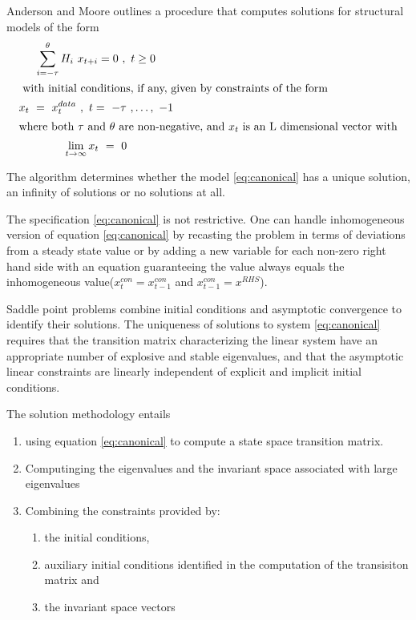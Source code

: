 Anderson and Moore \cite{ANDER:AIM2} outlines a procedure that computes solutions for structural models of the form
\begin{gather}
\sum_{i= - \tau}^\theta { H_i ~ x_{ t + i } }= 0~,~ t \geq 0 \label{eq:canonical}\\ \intertext{ with initial conditions, if any, given by constraints of the form}
x_t ~ = ~ x^{data}_t ~ , ~ t = ~ - \tau~, \ldots ,~ -1\\ \intertext{where both $\tau$ and $\theta$ are non-negative, and $x_t$ is an L dimensional vector with}
\lim_{ t \rightarrow \infty } x_t ~ = ~ 0
\end{gather}

The algorithm determines whether
the model \ref{eq:canonical} has a unique solution, an infinity of
 solutions or no solutions at all.

The specification \ref{eq:canonical} is not restrictive.
One can handle inhomogeneous version  of equation \ref{eq:canonical}
by recasting the problem in terms of  deviations from a steady state value or
by adding a new variable for each non-zero right hand side with an equation
guaranteeing the  value always equals  
the inhomogeneous value($x^{con}_t =x^{con}_{t-1}$ and $x^{con}_{t-1} = x^{RHS}$).



Saddle point problems combine initial conditions and asymptotic 
convergence to identify their solutions.
The uniqueness of solutions to 
system  \ref{eq:canonical} requires that
the transition matrix characterizing the linear system have an appropriate
number of explosive and stable eigenvalues\cite{blanchard80},
and that the asymptotic linear constraints 
are linearly independent of explicit and implicit initial 
conditions\cite{ANDER:AIM2}.

The solution methodology entails 
\begin{enumerate}
\item using equation \ref{eq:canonical} to
compute a state space transition matrix.
\item Computinging the eigenvalues and the invariant space associated with
large eigenvalues
\item Combining the constraints provided by:
  \begin{enumerate}
  \item the
initial conditions,
\item  auxiliary initial conditions identified in the computation of the transisiton matrix and 
\item the invariant space vectors
  \end{enumerate}
\end{enumerate}

